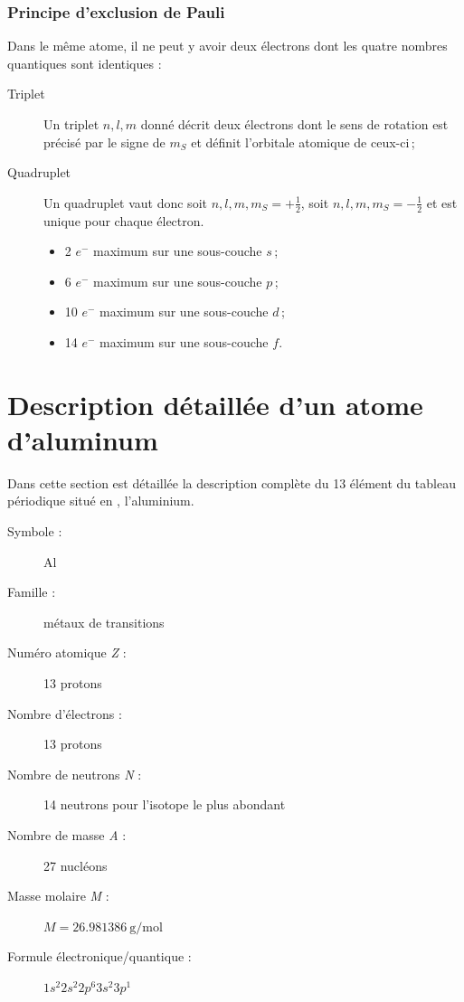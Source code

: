 \subsubsection{Principe d'exclusion de Pauli}

 Dans le même atome, il ne peut y avoir deux électrons dont les quatre nombres quantiques sont identiques : \begin{description}
	\item[Triplet] Un triplet $n, l, m$ donné décrit deux électrons dont le sens de rotation est précisé par le signe de $m_S$ et définit l'orbitale atomique de ceux-ci\,;
	\item[Quadruplet]  Un quadruplet vaut donc soit $n, l, m, m_S=+\frac{1}{2}$, soit $n, l, m, m_S=-\frac{1}{2}$ et est unique pour chaque électron.
	\begin{itemize}
		\item 2 $e^-$ maximum sur une sous-couche $s$\,;
		\item 6 $e^-$ maximum sur une sous-couche $p$\,;
		\item 10 $e^-$ maximum sur une sous-couche $d$\,;
		\item 14 $e^-$ maximum sur une sous-couche $f$.
	\end{itemize}
\end{description}
 
\section{Description détaillée d'un atome d'aluminum}
 
Dans cette section est détaillée la description complète du 13 élément du tableau périodique situé en  , l'aluminium.


 
\begin{description}
	\item[Symbole :] Al
	\item[Famille :] métaux de transitions
	\item[Numéro atomique \emph{Z} :] 13 protons
	\item[Nombre d'électrons :] 13 protons
	\item[Nombre de neutrons \emph{N} :] 14 neutrons pour l'isotope le plus abondant
	\item[Nombre de masse \emph{A} :] 27 nucléons
	\item[Masse molaire \emph{M} :] $M=\SI{26.981386}{\gram\per\mole}$ %
	\item[Formule électronique/quantique :] $1s^{2}2s^{2}2p^{6}3s^{2}3p^{1}$ %
\end{description}

